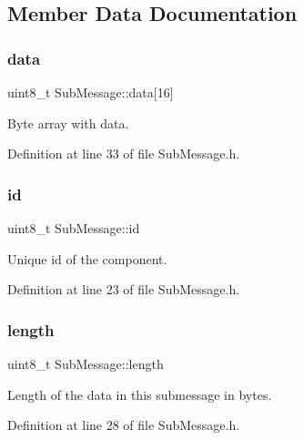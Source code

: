 \subsection{Member Data Documentation}
\mbox{\label{struct_sub_message_a7d923c5cdaa380c27d7c4cf60ea7c1be}} 
\subsubsection{\texorpdfstring{data}{data}}
{\footnotesize\ttfamily uint8\+\_\+t Sub\+Message\+::data\mbox{[}16\mbox{]}}



Byte array with data. 



Definition at line 33 of file Sub\+Message.\+h.

\mbox{\label{struct_sub_message_af3acc450c0686d7a9d15ccd9d548cb6d}} 
\subsubsection{\texorpdfstring{id}{id}}
{\footnotesize\ttfamily uint8\+\_\+t Sub\+Message\+::id}



Unique id of the component. 



Definition at line 23 of file Sub\+Message.\+h.

\mbox{\label{struct_sub_message_a276e06f5335ca7857c21ac8c0e51bd6d}} 
\subsubsection{\texorpdfstring{length}{length}}
{\footnotesize\ttfamily uint8\+\_\+t Sub\+Message\+::length}



Length of the data in this submessage in bytes. 



Definition at line 28 of file Sub\+Message.\+h.

\mbox{\label{struct_sub_message_a064f1d26d553da776dc749d37a18a499}} 
